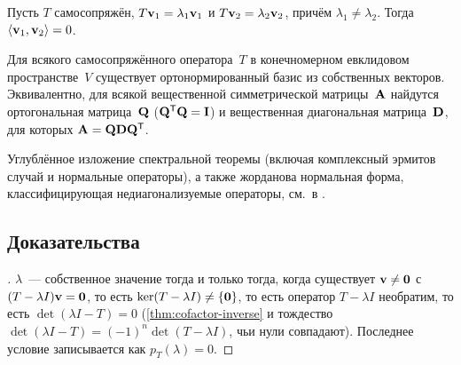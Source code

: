 \begin{theorem}
\label{thm:self-adj-orthog}
Пусть $T$ самосопряжён, $T\mathbf{v}_1 = \lambda_1 \mathbf{v}_1$ и
$T\mathbf{v}_2 = \lambda_2 \mathbf{v}_2$, причём $\lambda_1 \neq \lambda_2$.
Тогда $\langle \mathbf{v}_1, \mathbf{v}_2 \rangle = 0$.
\end{theorem}

\begin{theorem}
\label{thm:spectral}
Для всякого самосопряжённого оператора~$T$ в конечномерном евклидовом
пространстве~$V$ существует ортонормированный базис из собственных
векторов. Эквивалентно, для всякой вещественной симметрической
матрицы~$\mathbf{A}$ найдутся ортогональная матрица~$\mathbf{Q}$
($\mathbf{Q}^{\mathsf{T}} \mathbf{Q} = \mathbf{I}$) и вещественная диагональная
матрица~$\mathbf{D}$, для которых $\mathbf{A} = \mathbf{Q}\mathbf{D}\mathbf{Q}^{\mathsf{T}}$.
\end{theorem}

\begin{remark}
Углублённое изложение спектральной теоремы (включая комплексный
эрмитов случай и нормальные операторы), а также жорданова нормальная
форма, классифицирующая недиагонализуемые операторы, см.\ в
\cite{Beklemishev2025}.
\end{remark}

\subsection*{Доказательства}

\begin{proof}[]
$\lambda$~--- собственное значение тогда и только тогда, когда
существует $\mathbf{v} \neq \mathbf{0}$ с $(T - \lambda I)\mathbf{v} = \mathbf{0}$,
то есть $\ker(T - \lambda I) \neq \{\mathbf{0}\}$, то есть оператор
$T - \lambda I$ необратим, то есть $\det(\lambda I - T) = 0$
(\cref{thm:cofactor-inverse} и тождество
$\det(\lambda I - T) = (-1)^n \det(T - \lambda I)$, чьи нули совпадают).
Последнее условие записывается как $p_T(\lambda) = 0$.
\end{proof}

